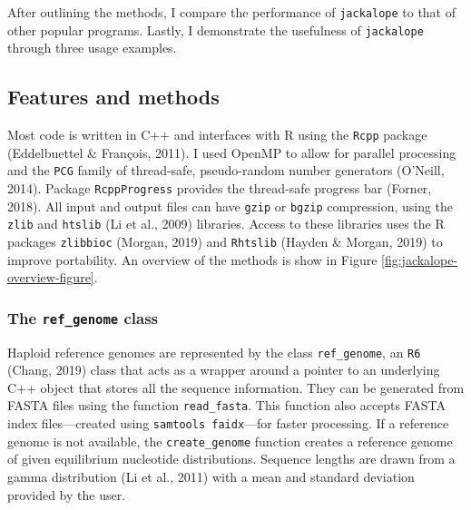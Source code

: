 \documentclass[12pt,]{article}
\begin{document}
After outlining the methods, I compare the performance of \texttt{jackalope} to that of
other popular programs.
Lastly, I demonstrate the usefulness of \texttt{jackalope} through three usage examples.

\hypertarget{features-and-methods}{%
\subsection{Features and methods}\label{features-and-methods}}

Most code is written in C++ and interfaces with R using the \texttt{Rcpp} package
(Eddelbuettel \& François, 2011).
I used OpenMP to allow for parallel processing and
the \texttt{PCG} family of thread-safe, pseudo-random number generators
(O'Neill, 2014).
Package \texttt{RcppProgress} provides the thread-safe progress bar
(Forner, 2018).
All input and output files can have \texttt{gzip} or \texttt{bgzip} compression, using the
\texttt{zlib} and
\texttt{htslib}
(Li et al., 2009)
libraries.
Access to these libraries uses the R packages
\texttt{zlibbioc} (Morgan, 2019) and
\texttt{Rhtslib} (Hayden \& Morgan, 2019)
to improve portability.
An overview of the methods is show in Figure \ref{fig:jackalope-overview-figure}.

\hypertarget{the-ref_genome-class}{%
\subsubsection{\texorpdfstring{The \texttt{ref\_genome} class}{The ref\_genome class}}\label{the-ref_genome-class}}

Haploid reference genomes are represented by the class \texttt{ref\_genome}, an
\texttt{R6} (Chang, 2019)
class that acts as a wrapper around a pointer to
an underlying C++ object that stores all the sequence information.
They can be generated from FASTA files using the function \texttt{read\_fasta}.
This function also accepts FASTA index files---created using
\texttt{samtools\ faidx}---for faster processing.
If a reference genome is not available, the \texttt{create\_genome} function creates
a reference genome of given equilibrium nucleotide distributions.
Sequence lengths are drawn from a gamma distribution
(Li et al., 2011)
with a mean and standard deviation provided by the user.
\end{document}
